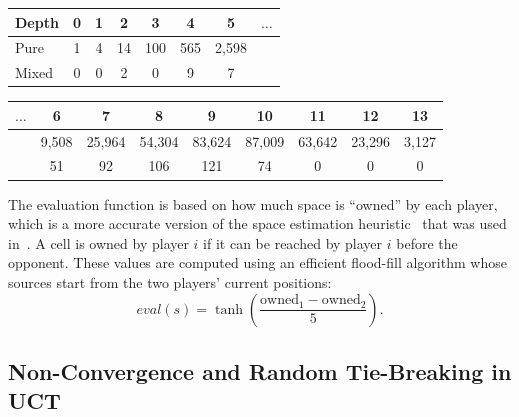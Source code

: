 \vspace{0.1cm}

\begin{center}
\small
\begin{flushleft}
\begin{tabular}{|l|c|c|c|c|c|c|c|}
\hline Depth & 0 & 1 & 2 & 3 & 4 & 5 & $\ldots$\\
\hline Pure  & 1 & 4 & 14 & 100 & 565 & 2,598 & \\
\hline Mixed & 0 & 0 & 2 & 0 & 9 & 7 & \\
\hline
\end{tabular}
\end{flushleft}
\begin{flushright}
\begin{tabular}{|c|c|c|c|c|c|c|c|c|}
\hline  $\ldots$ & 6 & 7 & 8 & 9 & 10 & 11 & 12 & 13\\
\hline  & 9,508 & 25,964 & 54,304 & 83,624 & 87,009 & 63,642 & 23,296 & 3,127\\
\hline  & 51 & 92 & 106 & 121 & 74 & 0 & 0 & 0 \\
\hline
\end{tabular}
\end{flushright}
\end{center}

\vspace{0.1cm}

The evaluation function is based on how much space is ``owned'' by each player, which is a more accurate version of the space estimation
heuristic~\cite{DenTeuling12Tron} that was used in~\cite{Lanctot13Tron}. A cell is owned by player $i$ if it can be reached
by player $i$ before the opponent. These values are computed using an efficient flood-fill algorithm whose sources start from the two players'
current positions:
\[
eval(s) = \tanh\left(\frac{\textrm{owned}_1 - \textrm{owned}_2}{5}\right).
\]


\subsection{Non-Convergence and Random Tie-Breaking in UCT}\label{sec:exp:brps}

